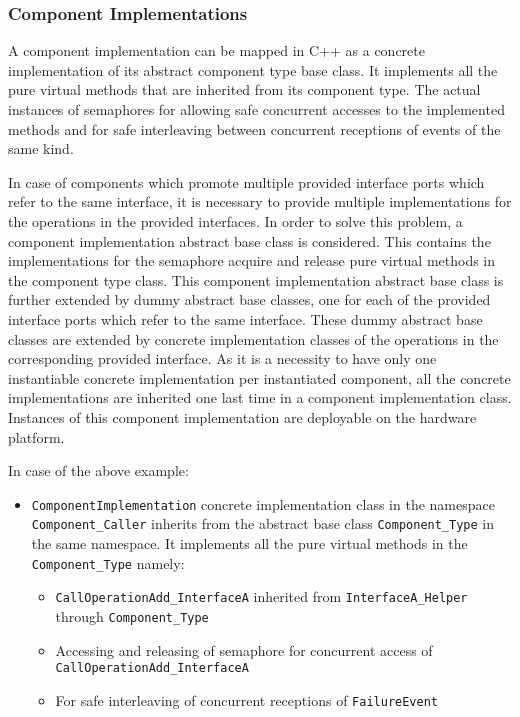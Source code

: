 \subsubsection{\textbf{Component Implementations}}
A component implementation can be mapped in C++ as a concrete implementation of its abstract component type base class. It implements all the pure virtual methods that are inherited from its component type. The actual instances of semaphores for allowing safe concurrent accesses to the implemented methods and for safe interleaving between concurrent receptions of events of the same kind.

In case of components which promote multiple provided interface ports which refer to the same interface, it is necessary to provide multiple implementations for the operations in the provided interfaces. In order to solve this problem, a component implementation abstract base class is considered. This contains the implementations for the semaphore acquire and release pure virtual methods in the component type class. This component implementation abstract base class is further extended by dummy abstract base classes, one for each of the provided interface ports which refer to the same interface. These dummy abstract base classes are extended by concrete implementation classes of the operations in the corresponding provided interface. As it is a necessity to have only one instantiable concrete implementation per instantiated component, all the concrete implementations are inherited one last time in a component implementation class. Instances of this component implementation are deployable on the hardware platform.
 
In case of the above example:
\begin{itemize}
\item \texttt{ComponentImplementation} concrete implementation class in the namespace \texttt{Component\_Caller} inherits from the abstract base class \texttt{Component\_Type} in the same namespace. It implements all the pure virtual methods in the \texttt{Component\_Type} namely:
\begin{itemize}
\item \texttt{CallOperationAdd\allowbreak\_InterfaceA} inherited from \texttt{InterfaceA\allowbreak\_Helper} through \texttt{Component\_Type}
\item Accessing and releasing of semaphore for concurrent access of \texttt{CallOperationAdd\allowbreak\_InterfaceA}
\item For safe interleaving of concurrent receptions of \texttt{FailureEvent}  
\end{itemize} 
\end{itemize} 

